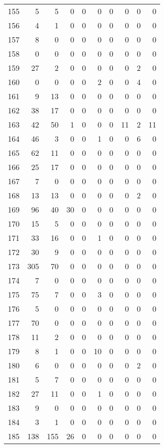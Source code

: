 \begin{tabular}{lrrrrrrrrr}
155 & 5 & 5 & 0 & 0 & 0 & 0 & 0 & 0 & 0 \\
156 & 4 & 1 & 0 & 0 & 0 & 0 & 0 & 0 & 0 \\
157 & 8 & 0 & 0 & 0 & 0 & 0 & 0 & 0 & 0 \\
158 & 0 & 0 & 0 & 0 & 0 & 0 & 0 & 0 & 0 \\
159 & 27 & 2 & 0 & 0 & 0 & 0 & 0 & 2 & 0 \\
160 & 0 & 0 & 0 & 0 & 2 & 0 & 0 & 4 & 0 \\
161 & 9 & 13 & 0 & 0 & 0 & 0 & 0 & 0 & 0 \\
162 & 38 & 17 & 0 & 0 & 0 & 0 & 0 & 0 & 0 \\
163 & 42 & 50 & 1 & 0 & 0 & 0 & 11 & 2 & 11 \\
164 & 46 & 3 & 0 & 0 & 1 & 0 & 0 & 6 & 0 \\
165 & 62 & 11 & 0 & 0 & 0 & 0 & 0 & 0 & 0 \\
166 & 25 & 17 & 0 & 0 & 0 & 0 & 0 & 0 & 0 \\
167 & 7 & 0 & 0 & 0 & 0 & 0 & 0 & 0 & 0 \\
168 & 13 & 13 & 0 & 0 & 0 & 0 & 0 & 2 & 0 \\
169 & 96 & 40 & 30 & 0 & 0 & 0 & 0 & 0 & 0 \\
170 & 15 & 5 & 0 & 0 & 0 & 0 & 0 & 0 & 0 \\
171 & 33 & 16 & 0 & 0 & 1 & 0 & 0 & 0 & 0 \\
172 & 30 & 9 & 0 & 0 & 0 & 0 & 0 & 0 & 0 \\
173 & 305 & 70 & 0 & 0 & 0 & 0 & 0 & 0 & 0 \\
174 & 7 & 0 & 0 & 0 & 0 & 0 & 0 & 0 & 0 \\
175 & 75 & 7 & 0 & 0 & 3 & 0 & 0 & 0 & 0 \\
176 & 5 & 0 & 0 & 0 & 0 & 0 & 0 & 0 & 0 \\
177 & 70 & 0 & 0 & 0 & 0 & 0 & 0 & 0 & 0 \\
178 & 11 & 2 & 0 & 0 & 0 & 0 & 0 & 0 & 0 \\
179 & 8 & 1 & 0 & 0 & 10 & 0 & 0 & 0 & 0 \\
180 & 6 & 0 & 0 & 0 & 0 & 0 & 0 & 2 & 0 \\
181 & 5 & 7 & 0 & 0 & 0 & 0 & 0 & 0 & 0 \\
182 & 27 & 11 & 0 & 0 & 1 & 0 & 0 & 0 & 0 \\
183 & 9 & 0 & 0 & 0 & 0 & 0 & 0 & 0 & 0 \\
184 & 3 & 1 & 0 & 0 & 0 & 0 & 0 & 0 & 0 \\
185 & 138 & 155 & 26 & 0 & 0 & 0 & 0 & 0 & 0 \\

\end{tabular}

